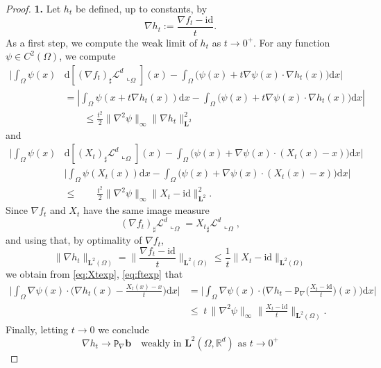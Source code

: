 \documentclass[11pt, twoside, reqno]{amsart}
\theoremstyle{definition} \newtheorem{definition}{Definition}[section]
\theoremstyle{definition} \newtheorem{remark}[definition]{Remark}
\theoremstyle{plain} \newtheorem{lemma}[definition]{Lemma}
\theoremstyle{plain} \newtheorem{proposition}[definition]{Proposition}
\theoremstyle{plain} \newtheorem{theorem}[definition]{Theorem}
\theoremstyle{plain} \newtheorem{corollary}[definition]{Corollary}
\theoremstyle{definition} \newtheorem{example}[definition]{Example}
\theoremstyle{plain} \newtheorem{claim}[clai]{Claim}
\theoremstyle{definition} \newtheorem{assumption}[definition]{Assumption}
\newcommand{\Id}{\mathrm{id}}
\newcommand{\1}{\mathbbm 1}
\renewcommand{\b}{\mathbf b}
\newcommand{\rest}{\llcorner}
\numberwithin{equation}{section} %
\theoremstyle{plain} \newtheorem*{theorem*}{Theorem}
\theoremstyle{plain} \newtheorem{mthm}[maintheorem]{Main Theorem}
\theoremstyle{plain} \newtheorem*{mthm*}{Main Theorem}
\theoremstyle{plain} \newtheorem*{conjecture*}{Conjecture}
\theoremstyle{plain} \newtheorem{conjecture}[definition]{Conjecture}
\theoremstyle{plain} \newtheorem*{problem*}{Problem}
\begin{document}
\begin{proof}
\textbf{1.} Let $h_t$ be defined, up to constants, by 
$$\nabla h_t := \frac{\nabla {f_t} - \Id}{t}.$$
 As a first step, we compute the weak limit of $h_t$ as $t \to 0^+$. 
For any function $\psi \in C^2(\Omega)$, we compute
\begin{equation}\label{eq:ftexp}
\begin{aligned}
 \Bigg|\int_\Omega \psi(x)   & \mathrm{d} [(\nabla f_t)_\sharp \mathscr L^d\rest_\Omega](x) - \int_\Omega \Big( \psi(x) + t \nabla \psi(x) \cdot \nabla h_t(x)\Big)  \mathrm{d} x \Bigg|\\
 & =  \left|\int_\Omega \psi(x + t \nabla h_t(x)) \mathrm{d} x - \int_\Omega \Big( \psi(x) + t \nabla \psi(x) \cdot \nabla h_t(x)\Big)  \mathrm{d} x\right| \\
 & \qquad \leq  \frac{t^2}{2} \|\nabla^2\psi\|_\infty \|\nabla h_t\|^2_{\mathbf L^2}
\end{aligned}
\end{equation}
and
\begin{equation}\label{eq:Xtexp}
\begin{aligned}
 \Bigg| \int_\Omega \psi(x)  & \mathrm{d} [(X_t)_\sharp \mathscr L^d \rest_\Omega](x)-\int_\Omega \Big(\psi(x)  +  \nabla \psi(x) \cdot (X_t(x) - x)\Big)  \mathrm{d} x\Bigg| & \\
 & \Bigg|\int_\Omega \psi(X_t(x))  \mathrm{d} x-\int_\Omega \Big(\psi(x)  +  \nabla \psi(x) \cdot (X_t(x) - x)\Big)  \mathrm{d} x\Bigg|   \\
&\leq \qquad  \frac{t^2}{2} \|\nabla^2\psi\|_\infty \|X_t - \Id \|^2_{\mathbf L^2}.
\end{aligned}
\end{equation}
Since $\nabla f_t$ and $X_t$ have the same image measure
$$
(\nabla {f_t})_\sharp \mathscr L^d \rest_{\Omega} = {X_t}_\sharp \mathscr L^d \rest_{\Omega},
$$
and using that, by  optimality of $\nabla {f_t}$,
\begin{equation*}
\|\nabla h_t\|_{\mathbf L^2(\Omega)} = \bigg\| \frac{\nabla f_t - \Id}{t} \bigg\|_{\mathbf L^2(\Omega)} \leq \frac{1}{t} \|X_t - \Id\|_{\mathbf L^2(\Omega)}
\end{equation*}
we obtain from \eqref{eq:Xtexp}, \eqref{eq:ftexp} that
\begin{equation*}
\begin{aligned}
\Bigg| \int_\Omega \nabla \psi(x) \cdot \bigg( \nabla h_t(x) - \frac{X_t(x) - x}{t} \bigg) {\mathrm{d} x} \Bigg| & = \Bigg|\int_\Omega \nabla \psi(x) \cdot \bigg( \nabla h_t - \mathtt P_\nabla \bigg( \frac{X_t - \Id}{t} \bigg)(x) \bigg) {\mathrm{d} x}\Bigg| \\
& \leq  \; t \, \|\nabla^2 \psi\|_\infty  \bigg\| \frac{X_t - \Id}{t} \bigg\|_{\mathbf L^2(\Omega)}.
\end{aligned}
\end{equation*}
Finally, letting $t \to 0$ we conclude 
\begin{equation}\label{eq:weakht}
    \nabla h_t \longrightarrow \mathtt P_\nabla \b \quad \text{weakly in $\mathbf L^2(\Omega, \mathbb R^d)$ as $t \to 0^+$}
\end{equation}


\end{proof}
\end{document}
